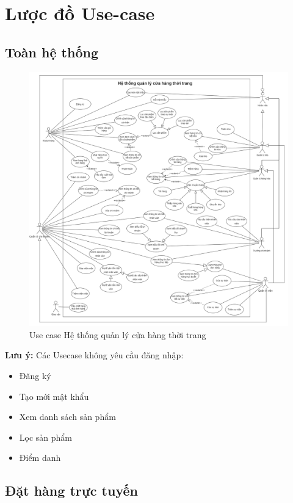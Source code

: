 \section{Lược đồ Use-case}
\subsection{Toàn hệ thống}
\begin{figure}[!htp]
    \centering    \includegraphics[width=16.5cm]{img/UseCase/UseCase-full.drawio.png}
    \newline
    \caption{Use case Hệ thống quản lý cửa hàng thời trang}
\end{figure}
\textbf{Lưu ý:} Các Usecase không yêu cầu đăng nhập:
\begin{itemize}
    \item Đăng ký
    \item Tạo mới mật khẩu
    \item Xem danh sách sản phẩm
    \item Lọc sản phẩm
    \item Điểm danh
\end{itemize}
\newpage


\subsection{Đặt hàng trực tuyến}

